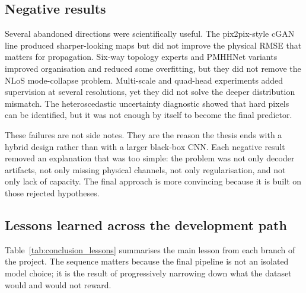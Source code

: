 \subsection{Negative results}

Several abandoned directions were scientifically useful. The pix2pix-style cGAN
line produced sharper-looking maps but did not improve the physical RMSE that
matters for propagation. Six-way topology experts and PMHHNet variants improved
organisation and reduced some overfitting, but they did not remove the NLoS
mode-collapse problem. Multi-scale and quad-head experiments added supervision at
several resolutions, yet they did not solve the deeper distribution mismatch.
The heteroscedastic uncertainty diagnostic showed that hard pixels can be identified, but it
was not enough by itself to become the final predictor.

These failures are not side notes. They are the reason the thesis ends with a
hybrid design rather than with a larger black-box CNN. Each negative result
removed an explanation that was too simple: the problem was not only decoder
artifacts, not only missing physical channels, not only regularisation, and not
only lack of capacity. The final approach is more convincing because it is built
on those rejected hypotheses.

\subsection{Lessons learned across the development path}

Table~\ref{tab:conclusion_lessons} summarises the main lesson from each branch
of the project. The sequence matters because the final pipeline is not an
isolated model choice; it is the result of progressively narrowing down what
the dataset would and would not reward.


